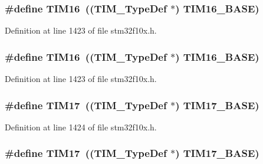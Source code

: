 \subsubsection[{\texorpdfstring{T\+I\+M16}{TIM16}}]{\setlength{\rightskip}{0pt plus 5cm}\#define T\+I\+M16~(({\bf T\+I\+M\+\_\+\+Type\+Def} $\ast$) {\bf T\+I\+M16\+\_\+\+B\+A\+SE})}\hypertarget{group___peripheral__declaration_ga73ec606e7dacf17e18c661e8ff8c7c8d}{}\label{group___peripheral__declaration_ga73ec606e7dacf17e18c661e8ff8c7c8d}


Definition at line 1423 of file stm32f10x.\+h.

\subsubsection[{\texorpdfstring{T\+I\+M16}{TIM16}}]{\setlength{\rightskip}{0pt plus 5cm}\#define T\+I\+M16~(({\bf T\+I\+M\+\_\+\+Type\+Def} $\ast$) {\bf T\+I\+M16\+\_\+\+B\+A\+SE})}\hypertarget{group___peripheral__declaration_ga73ec606e7dacf17e18c661e8ff8c7c8d}{}\label{group___peripheral__declaration_ga73ec606e7dacf17e18c661e8ff8c7c8d}


Definition at line 1423 of file stm32f10x.\+h.

\subsubsection[{\texorpdfstring{T\+I\+M17}{TIM17}}]{\setlength{\rightskip}{0pt plus 5cm}\#define T\+I\+M17~(({\bf T\+I\+M\+\_\+\+Type\+Def} $\ast$) {\bf T\+I\+M17\+\_\+\+B\+A\+SE})}\hypertarget{group___peripheral__declaration_ga65aea6c8b36439e44ad6cde0e6891aab}{}\label{group___peripheral__declaration_ga65aea6c8b36439e44ad6cde0e6891aab}


Definition at line 1424 of file stm32f10x.\+h.

\subsubsection[{\texorpdfstring{T\+I\+M17}{TIM17}}]{\setlength{\rightskip}{0pt plus 5cm}\#define T\+I\+M17~(({\bf T\+I\+M\+\_\+\+Type\+Def} $\ast$) {\bf T\+I\+M17\+\_\+\+B\+A\+SE})}\hypertarget{group___peripheral__declaration_ga65aea6c8b36439e44ad6cde0e6891aab}{}\label{group___peripheral__declaration_ga65aea6c8b36439e44ad6cde0e6891aab}



